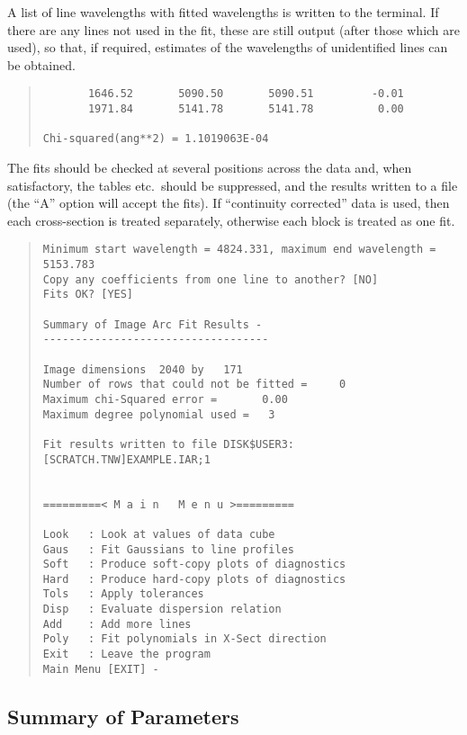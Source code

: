 A list of line wavelengths with fitted wavelengths is written to
the terminal. If there are any lines not used in the fit, these are
still output (after those which are used), so that, if required,
estimates of the wavelengths of unidentified lines can be obtained.
\begin{quote}\begin{verbatim}
       1646.52       5090.50       5090.51         -0.01
       1971.84       5141.78       5141.78          0.00

Chi-squared(ang**2) = 1.1019063E-04
\end{verbatim}\end{quote}
The fits should be checked at several positions across the data and,
when satisfactory, the tables etc.\ should be suppressed, and the
results written to a file (the ``A'' option will accept the fits).
If ``continuity corrected'' data is used, then each cross-section is
treated separately, otherwise each block is treated as one fit.
\begin{quote}\begin{verbatim}
Minimum start wavelength = 4824.331, maximum end wavelength = 5153.783
Copy any coefficients from one line to another? [NO]
Fits OK? [YES]

Summary of Image Arc Fit Results -
-----------------------------------

Image dimensions  2040 by   171
Number of rows that could not be fitted =     0
Maximum chi-Squared error =       0.00
Maximum degree polynomial used =   3

Fit results written to file DISK$USER3:[SCRATCH.TNW]EXAMPLE.IAR;1


=========< M a i n   M e n u >=========

Look   : Look at values of data cube
Gaus   : Fit Gaussians to line profiles
Soft   : Produce soft-copy plots of diagnostics
Hard   : Produce hard-copy plots of diagnostics
Tols   : Apply tolerances
Disp   : Evaluate dispersion relation
Add    : Add more lines
Poly   : Fit polynomials in X-Sect direction
Exit   : Leave the program
Main Menu [EXIT] -
\end{verbatim}\end{quote}

\subsection{Summary of Parameters}

